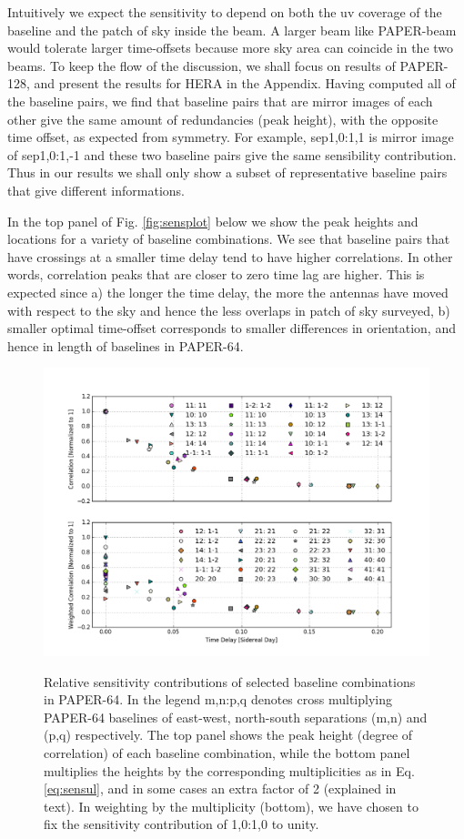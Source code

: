 \documentclass[preprint2,numberedappendix,tighten,twocolappendix]{aastex6}  %
\renewcommand\[{\begin{equation}}
\renewcommand\]{\end{equation}}
\begin{document}
 
Intuitively we expect the sensitivity to depend on both the uv coverage of the baseline and the patch of sky inside the beam. A larger beam like PAPER-beam would tolerate larger time-offsets because more sky area can coincide in the two beams. To keep the flow of the discussion, we shall focus on results of PAPER-128, and present the results for HERA in the Appendix. 
Having computed all of the baseline pairs, we find that baseline pairs that are mirror images of each other 
give the same amount of redundancies (peak height), with the opposite time offset, as expected from symmetry. 
For example, sep1,0:1,1 is mirror image of sep1,0:1,-1 and these two baseline pairs
give the same sensibility contribution. Thus in our results we shall only show a subset of representative baseline pairs 
that give different informations. 

In the top panel of Fig. \eqref{fig:sensplot} below
we show the peak heights and locations for a variety of baseline combinations.
We see that baseline pairs that have crossings at a smaller time delay
tend to have higher correlations. In other words, correlation peaks
that are closer to zero time lag are higher. This is expected since
a) the longer the time delay, the more the antennas have moved with respect
to the sky and hence the less overlaps in patch of sky surveyed, b) smaller optimal
time-offset corresponds to smaller differences in orientation, and hence in length of
baselines in PAPER-64. 

\begin{figure}[H]
\includegraphics[width=\linewidth]{sensitivity}
\label{fig:sensplot}
\caption{Relative sensitivity contributions of selected baseline combinations in PAPER-64. In the legend m,n:p,q denotes cross
multiplying PAPER-64 baselines of east-west, north-south separations (m,n) and (p,q) respectively. The top
panel shows the peak height (degree of correlation) of each baseline
combination, while the bottom panel multiplies the heights by the
corresponding multiplicities as in Eq. \eqref{eq:sensul}, and in some cases an extra factor of 2 (explained in text). 
In weighting by the multiplicity (bottom), we have chosen to fix the sensitivity 
contribution of 1,0:1,0 to unity. }


\end{figure}
\end{document}
